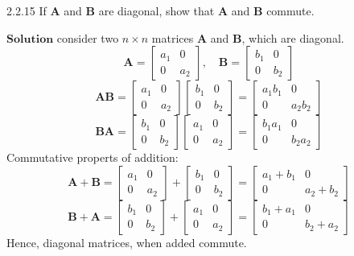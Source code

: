 \documentclass{article}
\begin{document}
\begin{flushleft}
\begin{mybox}{2.2.15}
If $\mathbf{A}$ and $\mathbf{B}$ are diagonal, show that $\mathbf{A}$ and $\mathbf{B}$ commute.
\end{mybox}

$\boxed{\textbf{Solution}}$  consider two $n\times n$ matrices $\mathbf{A}$ and $\mathbf{B}$, which are diagonal.
$$\mathbf{A}=\left[\begin{array}{ll}{a_{1}} & {0} \\ {0} & {a_{2}}\end{array}\right], \quad \mathbf{B}=\left[\begin{array}{ll}{b_{1}} & {0} \\ {0} & {b_{2}}\end{array}\right]$$
$$\mathbf{A} \mathbf{B}=\left[\begin{array}{ll}{a_{1}} & {0} \\ {0} & {a_{2}}\end{array}\right]\left[\begin{array}{ll}{b_{1}} & {0} \\ {0} & {b_{2}}\end{array}\right]=\left[\begin{array}{cc}{a_{1} b_{1}} & {0} \\ {0} & {a_{2} b_{2}}\end{array}\right]$$
$$\mathbf{B} \mathbf{A}=\left[\begin{array}{ll}{b_{1}} & {0} \\ {0} & {b_{2}}\end{array}\right]\left[\begin{array}{ll}{a_{1}} & {0} \\ {0} & {a_{2}}\end{array}\right]=\left[\begin{array}{lll}{b_{1} a_{1}} & {0} \\ {0} & {b_{2} a_{2}}\end{array}\right]$$
Commutative properts of addition:
$$\mathbf{A}+\mathbf{B}=\left[\begin{array}{ll}{a_{1}} & {0} \\ {0} & {a_{2}}\end{array}\right]+\left[\begin{array}{ll}{b_{1}} & {0} \\ {0} & {b_{2}}\end{array}\right]=\left[\begin{array}{ccc}{a_{1}+b_{1}} & {0} \\ {0} & {a_{2}+b_{2}}\end{array}\right]$$
$$\mathbf{B}+\mathbf{A}=\left[\begin{array}{ll}{b_{1}} & {0} \\ {0} & {b_{2}}\end{array}\right]+\left[\begin{array}{ll}{a_{1}} & {0} \\ {0} & {a_{2}}\end{array}\right]=\left[\begin{array}{cc}{b_{1}+a_{1}} & {0} \\ {0} & {b_{2}+a_{2}}\end{array}\right]$$
Hence, diagonal matrices, when added commute.



\end{flushleft}
\end{document}
